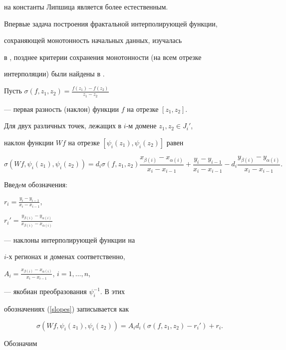 на константы Липшица является более естественным.


Впервые задача построения фрактальной интерполирующей функции,


сохраняющей монотонность начальных данных, изучалась


в \cite{kocic}, позднее критерии сохранения монотонности (на всем отрезке


интерполяции) были найдены в \cite{vasilyev}.





Пусть $ \sigma(f,z_1,z_2) = \frac{ f(z_1) -f(z_2)}{z_1-z_2} $


--- первая разность (наклон) функции $f$ на отрезке $[ z_1, z_2 ] $.


Для двух различных точек, лежащих в $i$-м домене $z_1,z_2 \in J_i' $,


наклон функции $Wf$ на отрезке $[ \psi_i(z_1), \psi_i(z_2)] $ равен


\begin{equation} \label{slopes}


\sigma (W f , \psi_i (z_1),\psi_i(z_2)) =


d_i \sigma(f,z_1,z_2)\frac{x_{\beta(i)}-x_{\alpha(i)}}{x_{i}-x_{i-1}}


+ \frac{y_i-y_{i-1}}{x_{i}-x_{i-1}} - d_i


\frac{y_{\beta(i)}-y_{\alpha(i)}}{x_{i}-x_{i-1}}.


\end{equation}


Введeм обозначения:


$r_i=\frac{y_i-y_{i-1}}{x_i-x_{i-1}}$,


$r_i'=\frac{y_{\beta(i)}-y_{\alpha(i)}}{x_{\beta(i)}-x_{\alpha(i)}}$


--- наклоны интерполирующей функции на


$i$-х регионах и доменах соответственно,


$A_i=\frac{x_{\beta(i)}-x_{\alpha(i)}}{x_{i}-x_{i-1}}$, $i=1,\dotsc,n$,


--- якобиан преобразования $\psi_i^{-1}$. В этих


обозначениях (\ref{slopes}) записывается как


$$


\sigma (W f , \psi_i (z_1),\psi_i(z_2)) =


A_i d_i (\sigma(f,z_1,z_2) - r_i') + r_i.


$$


Обозначим


